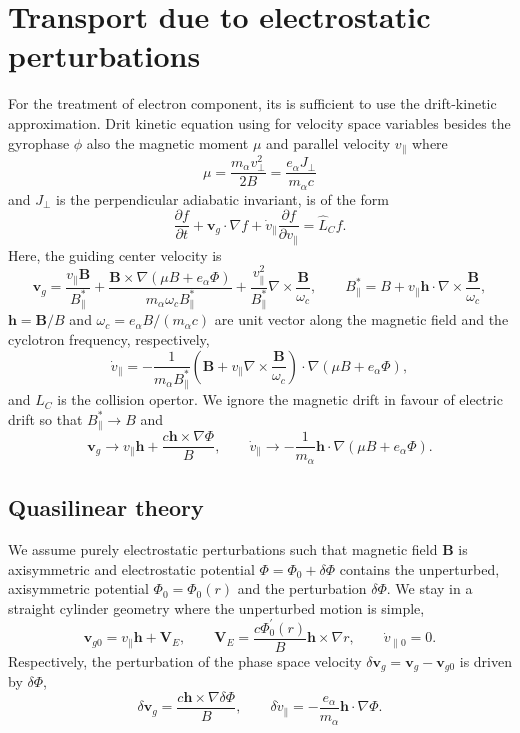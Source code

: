 \documentclass[preprint,prb,aps,prb]{revtex4}
\newcommand{\bB}{{\mathbf B}}
\newcommand{\bh}{{\mathbf h}}
\newcommand{\bV}{{\mathbf V}}
\newcommand{\bv}{{\mathbf v}}
\newcommand{\be}[1]{\begin{equation} \label{#1}}
\newcommand{\ee}{\end{equation}}
\newcommand{\difp}[2]{\frac{\partial #1}{\partial #2}}
\begin{document}
\section{Transport due to electrostatic perturbations}

For the treatment of electron component, its is sufficient to use the drift-kinetic approximation.
Drit kinetic equation using for velocity space variables besides the gyrophase $\phi$ also
the magnetic moment $\mu$ and parallel velocity $v_\parallel$ where
$$
\mu = \frac{m_\alpha v_\perp^2}{2 B}=\frac{e_\alpha  J_\perp}{m_\alpha  c}
$$
and $J_\perp$ is the perpendicular adiabatic invariant,
is of the form
\be{drikineq}
\difp{f}{t}+\bv_g\cdot\nabla f + \dot v_\parallel \difp{f}{v_\parallel}= \hat L_C f.
\ee
Here, the guiding center velocity is
\be{gvcvelpp}
\bv_g = \frac{v_\parallel \bB}{B_\parallel^\ast} 
+ \frac{\bB\times\nabla \left(\mu B + e_\alpha \Phi\right)}
{m_\alpha \omega_c B_\parallel^\ast}
+\frac{v_\parallel^2}{B_\parallel^\ast}\nabla\times \frac{\bB}{\omega_c},
\qquad
B_\parallel^\ast = B + v_\parallel \bh\cdot \nabla\times\frac{\bB}{\omega_c},
\ee
$\bh = \bB/B$ and $\omega_c=e_\alpha  B/(m_\alpha c)$ are unit vector along the magnetic field and the cyclotron frequency, respectively,
\be{vpardot}
\dot v_\parallel = - \frac{1}{m_\alpha  B_\parallel^\ast}\left(\bB+ v_\parallel\nabla\times \frac{\bB}{\omega_c}\right)
\cdot\nabla \left(\mu B + e_\alpha \Phi\right),
\ee
and $\hat L_C$ is the collision opertor.
We ignore the magnetic drift in favour of electric drift so that $B_\parallel^\ast \rightarrow B$ and
\be{nomagdrift}
\bv_g \rightarrow v_\parallel \bh + \frac{c \bh\times\nabla\Phi}{B},
\qquad
\dot v_\parallel \rightarrow - \frac{1}{m_\alpha } \bh\cdot\nabla\left(\mu B + e_\alpha \Phi\right). 
\ee

\subsection{Quasilinear theory}

We assume purely electrostatic perturbations such that magnetic field $\bB$ 
is axisymmetric and electrostatic potential $\Phi=\Phi_0 + \delta \Phi$ contains
the unperturbed, axisymmetric potential $\Phi_0=\Phi_0(r)$ and the perturbation 
$\delta \Phi$.
We stay in a straight cylinder geometry where the unperturbed motion is simple,
\be{phsp_vel_0}
\bv_{g0} = v_\parallel \bh+\bV_E,
\qquad
\bV_E = \frac{c \Phi_0^\prime(r)}{B}\bh\times\nabla r,
\qquad
\dot v_{\parallel 0} = 0.
\ee
Respectively, the perturbation of the phase space velocity $\delta \bv_{g} = \bv_{g}-\bv_{g0}$ is driven by $\delta \Phi$,
\be{phsp_vel_1}
\delta \bv_{g} = \frac{c \bh\times\nabla\delta\Phi}{B},
\qquad
\delta\dot v_{\parallel} = - \frac{e_\alpha}{m_\alpha } \bh\cdot\nabla\Phi.
\ee
\end{document}
